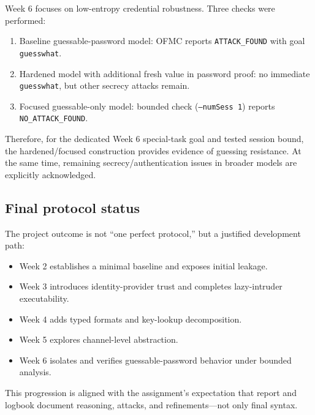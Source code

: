\documentclass[11pt,a4paper]{article}
\begin{document}
Week 6 focuses on low-entropy credential robustness.
Three checks were performed:
\begin{enumerate}
  \item Baseline guessable-password model: OFMC reports \texttt{ATTACK\_FOUND} with goal \texttt{guesswhat}.
  \item Hardened model with additional fresh value in password proof: no immediate \texttt{guesswhat}, but other secrecy attacks remain.
  \item Focused guessable-only model: bounded check (\texttt{--numSess 1}) reports \texttt{NO\_ATTACK\_FOUND}.
\end{enumerate}

Therefore, for the dedicated Week 6 special-task goal and tested session bound,
the hardened/focused construction provides evidence of guessing resistance.
At the same time, remaining secrecy/authentication issues in broader models are explicitly acknowledged.

\subsection{Final protocol status}

The project outcome is not ``one perfect protocol,'' but a justified development path:
\begin{itemize}
  \item Week 2 establishes a minimal baseline and exposes initial leakage.
  \item Week 3 introduces identity-provider trust and completes lazy-intruder executability.
  \item Week 4 adds typed formats and key-lookup decomposition.
  \item Week 5 explores channel-level abstraction.
  \item Week 6 isolates and verifies guessable-password behavior under bounded analysis.
\end{itemize}

This progression is aligned with the assignment's expectation that report and logbook document reasoning, attacks, and refinements---not only final syntax.
\end{document}

